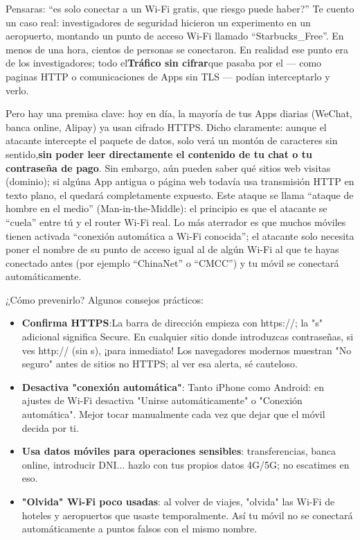 Pensaras: “es solo conectar a un Wi-Fi gratis, que riesgo puede haber?” Te cuento un caso real: investigadores de seguridad hicieron un experimento en un aeropuerto, montando un punto de acceso Wi-Fi llamado “Starbucks\_Free”. En menos de una hora, cientos de personas se conectaron. En realidad ese punto era de los investigadores; todo el\textbf{Tráfico sin cifrar}que pasaba por el — como paginas HTTP o comunicaciones de Apps sin TLS — podían interceptarlo y verlo.

Pero hay una premisa clave: hoy en día, la mayoría de tus Apps diarias (WeChat, banca online, Alipay) ya usan cifrado HTTPS. Dicho claramente: aunque el atacante intercepte el paquete de datos, solo verá un montón de caracteres sin sentido,\textbf{sin poder leer directamente el contenido de tu chat o tu contraseña de pago}. Sin embargo, aún pueden saber qué sitios web visitas (dominio); si algúna App antigua o página web todavía usa transmisión HTTP en texto plano, el quedará completamente expuesto. Este ataque se llama “ataque de hombre en el medio” (Man-in-the-Middle): el principio es que el atacante se “cuela” entre tú y el router Wi-Fi real. Lo más aterrador es que muchos móviles tienen activada “conexión automática a Wi-Fi conocida”; el atacante solo necesita poner el nombre de su punto de acceso igual al de algún Wi-Fi al que te hayas conectado antes (por ejemplo “ChinaNet” o “CMCC”) y tu móvil se conectará automáticamente.

¿Cómo prevenirlo? Algunos consejos prácticos:

\begin{itemize}
  \item \textbf{Confirma HTTPS}:La barra de dirección empieza con https://; la "s" adicional significa Secure. En cualquier sitio donde introduzcas contraseñas, si ves http:// (sin s), ¡para inmediato! Los navegadores modernos muestran "No seguro" antes de sitios no HTTPS; al ver esa alerta, sé cauteloso.
  \item \textbf{Desactiva "conexión automática"}: Tanto iPhone como Android: en ajustes de Wi-Fi desactiva "Unirse automáticamente" o "Conexión automática". Mejor tocar manualmente cada vez que dejar que el móvil decida por ti.
  \item \textbf{Usa datos móviles para operaciones sensibles}: transferencias, banca online, introducir DNI... hazlo con tus propios datos 4G/5G; no escatimes en eso.
  \item \textbf{"Olvida" Wi-Fi poco usadas}: al volver de viajes, "olvida" las Wi-Fi de hoteles y aeropuertos que usaste temporalmente. Así tu móvil no se conectará automáticamente a puntos falsos con el mismo nombre.
\end{itemize}

